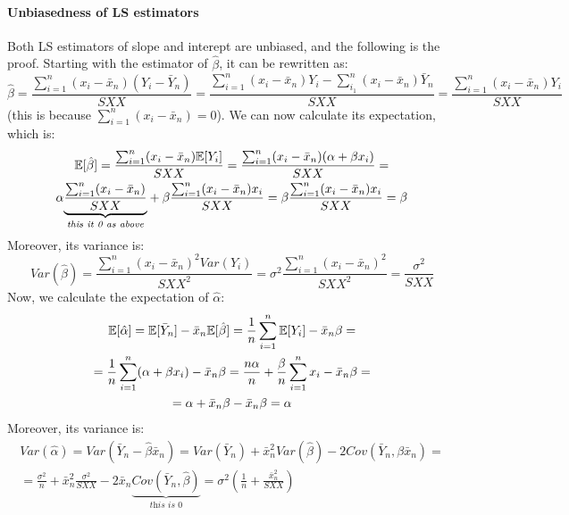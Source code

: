 \paragraph{Unbiasedness of LS estimators}
Both LS estimators of slope and interept are unbiased, and the following is the proof. Starting with the estimator of $\hat{\beta}$, it can be rewritten as:
\[
    \hat{\beta} = \frac{\sum_{i=1}^n (x_i - \bar{x}_n) (Y_i - \bar{Y}_n)}{SXX} = \frac{\sum_{i=1}^n (x_i - \bar{x}_n) Y_i - \sum_{i_1}^n (x_i - \bar{x}_n) \bar{Y}_n}{SXX} = \frac{\sum_{i=1}^n (x_i - \bar{x}_n) Y_i}{SXX}
\]
(this is because $\sum_{i=1}^n (x_i - \bar{x}_n) = 0$). We can now calculate its expectation, which is:
\begin{gather*}
    \mathbb{E}[\hat{\beta}] = \frac{\sum_{i=1}^n (x_i - \bar{x}_n) \mathbb{E}[Y_i]}{SXX} = \frac{\sum_{i=1}^n (x_i - \bar{x}_n) (\alpha + \beta x_i)}{SXX} = \\
    \alpha \underset{\textit{this it 0 as above}}{\underbrace{\frac{\sum_{i=1}^n (x_i - \bar{x}_n)}{SXX}}} + \beta \frac{\sum_{i=1}^n (x_i - \bar{x}_n) x_i}{SXX} = \beta \frac{\sum_{i=1}^n (x_i - \bar{x}_n) x_i}{SXX} = \beta
\end{gather*}
Moreover, its variance is:
\[
    Var(\hat{\beta}) = \frac{\sum_{i=1}^n (x_i - \bar{x}_n)^2 Var(Y_i)}{SXX^2} = \sigma^2 \frac{\sum_{i=1}^n (x_i - \bar{x}_n)^2}{SXX^2} = \frac{\sigma^2}{SXX}
\]
Now, we calculate the expectation of $\hat{\alpha}$:
\begin{gather*}
    \mathbb{E}[\hat{\alpha}] = \mathbb{E}[\bar{Y}_n] - \bar{x}_n \mathbb{E}[\hat{\beta}] = \frac{1}{n} \sum_{i=1}^n \mathbb{E}[Y_i] - \bar{x}_n \beta = \\
    = \frac{1}{n} \sum_{i=1}^n (\alpha + \beta x_i) - \bar{x}_n \beta = \frac{n \alpha}{n} + \frac{\beta}{n} \sum_{i=1}^n x_i - \bar{x}_n \beta = \\
    = \alpha + \bar{x}_n \beta - \bar{x}_n \beta = \alpha 
\end{gather*}
Moreover, its variance is:
\begin{gather*}
    Var(\hat{\alpha}) = Var(\bar{Y}_n - \hat{\beta} \bar{x}_n) = Var(\bar{Y}_n) + \bar{x}_n^2 Var(\hat{\beta}) - 2 Cov(\bar{Y}_n, \beta \bar{x}_n) = \\
    = \frac{\sigma^2}{n} + \bar{x}_n^2 \frac{\sigma^2}{SXX} - 2 \bar{x}_n \underset{\textit{this is 0}}{\underbrace{Cov(\bar{Y}_n, \hat{\beta})}} = \sigma^2 \left( \frac{1}{n} + \frac{\bar{x}_n^2}{SXX}\right)
\end{gather*}

